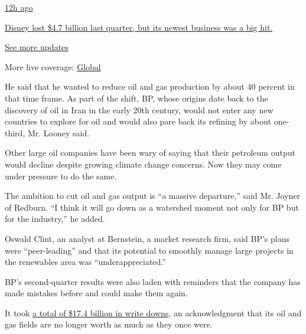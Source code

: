 \href{https://www.nytimes3xbfgragh.onion/live/2020/08/04/business/stock-market-today-coronavirus?action=click\&pgtype=Article\&state=default\&region=MAIN_CONTENT_1\&context=storylines_live_updates\#disney-lost-4-7-billion-last-quarter-but-its-newest-business-was-a-big-hit}{12h
ago}

\href{https://www.nytimes3xbfgragh.onion/live/2020/08/04/business/stock-market-today-coronavirus?action=click\&pgtype=Article\&state=default\&region=MAIN_CONTENT_1\&context=storylines_live_updates\#disney-lost-4-7-billion-last-quarter-but-its-newest-business-was-a-big-hit}{Disney
lost \$4.7 billion last quarter, but its newest business was a big hit.}

\href{https://www.nytimes3xbfgragh.onion/live/2020/08/04/business/stock-market-today-coronavirus?action=click\&pgtype=Article\&state=default\&region=MAIN_CONTENT_1\&context=storylines_live_updates}{See
more updates}

More live coverage:
\href{https://www.nytimes3xbfgragh.onion/2020/08/04/world/coronavirus-cases.html?action=click\&pgtype=Article\&state=default\&region=MAIN_CONTENT_1\&context=storylines_live_updates}{Global}

He said that he wanted to reduce oil and gas production by about 40
percent in that time frame. As part of the shift, BP, whose origins date
back to the discovery of oil in Iran in the early 20th century, would
not enter any new countries to explore for oil and would also pare back
its refining by about one-third, Mr. Looney said.

Other large oil companies have been wary of saying that their petroleum
output would decline despite growing climate change concerns. Now they
may come under pressure to do the same.

The ambition to cut oil and gas output is ``a massive departure,'' said
Mr. Joyner of Redburn. ``I think it will go down as a watershed moment
not only for BP but for the industry,'' he added.

Oswald Clint, an analyst at Bernstein, a market research firm, said BP's
plans were ``peer-leading'' and that its potential to smoothly manage
large projects in the renewables area was ``underappreciated.''

BP's second-quarter results were also laden with reminders that the
company has made mistakes before and could make them again.

It took
\href{https://www.nytimes3xbfgragh.onion/2020/06/15/business/energy-environment/bp-oil-gas-write-down.html}{a
total of \$17.4 billion in write downs}, an acknowledgment that its oil
and gas fields are no longer worth as much as they once were.


